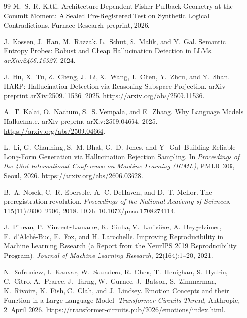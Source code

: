 \documentclass[10pt, letterpaper]{article}
\begin{document}
\begin{thebibliography}{99}
M.~S.~R. Kitti.
\newblock Architecture-Dependent Fisher Pullback Geometry at the Commit
Moment: A Sealed Pre-Registered Test on Synthetic Logical
Contradictions.
\newblock Furnace Research preprint, 2026.

J.~Kossen, J.~Han, M.~Razzak, L.~Schut, S.~Malik, and Y.~Gal.
\newblock Semantic Entropy Probes: Robust and Cheap Hallucination
Detection in LLMs.
\newblock \emph{arXiv:2406.15927}, 2024.

J.~Hu, X.~Tu, Z.~Cheng, J.~Li, X.~Wang, J.~Chen, Y.~Zhou, and Y.~Shan.
\newblock HARP: Hallucination Detection via Reasoning Subspace
Projection.
\newblock arXiv preprint arXiv:2509.11536, 2025.
\newblock \url{https://arxiv.org/abs/2509.11536}.

A.~T. Kalai, O.~Nachum, S.~S. Vempala, and E.~Zhang.
\newblock Why Language Models Hallucinate.
\newblock arXiv preprint arXiv:2509.04664, 2025.
\newblock \url{https://arxiv.org/abs/2509.04664}.




L.~Li, G.~Channing, S.~M. Bhat, G.~D. Jones, and Y.~Gal.
\newblock Building Reliable Long-Form Generation via Hallucination
Rejection Sampling.
\newblock In \emph{Proceedings of the 43rd International Conference on
Machine Learning (ICML)}, PMLR 306, Seoul, 2026.
\newblock \url{https://arxiv.org/abs/2606.03628}.

B.~A. Nosek, C.~R. Ebersole, A.~C. DeHaven, and D.~T. Mellor.
\newblock The preregistration revolution.
\newblock \emph{Proceedings of the National Academy of Sciences},
115(11):2600--2606, 2018.
\newblock \mbox{DOI: 10.1073/pnas.1708274114}.

J.~Pineau, P.~Vincent-Lamarre, K.~Sinha, V.~Larivi\`ere,
A.~Beygelzimer, F.~d'Alch\'e-Buc, E.~Fox, and H.~Larochelle.
\newblock Improving Reproducibility in Machine Learning Research (a
Report from the NeurIPS 2019 Reproducibility Program).
\newblock \emph{Journal of Machine Learning Research},
22(164):1--20, 2021.

N.~Sofroniew, I.~Kauvar, W.~Saunders, R.~Chen, T.~Henighan, S.~Hydrie,
C.~Citro, A.~Pearce, J.~Tarng, W.~Gurnee, J.~Batson, S.~Zimmerman,
K.~Rivoire, K.~Fish, C.~Olah, and J.~Lindsey.
\newblock Emotion Concepts and their Function in a Large Language
Model.
\newblock \emph{Transformer Circuits Thread}, Anthropic, 2~April 2026.
\newblock \url{https://transformer-circuits.pub/2026/emotions/index.html}.


\end{thebibliography}
\end{document}
